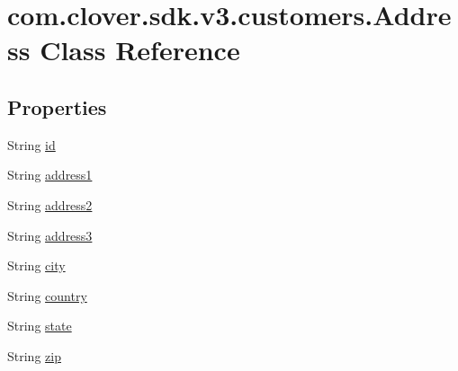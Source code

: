 \hypertarget{classcom_1_1clover_1_1sdk_1_1v3_1_1customers_1_1_address}{}\section{com.\+clover.\+sdk.\+v3.\+customers.\+Address Class Reference}
\label{classcom_1_1clover_1_1sdk_1_1v3_1_1customers_1_1_address}
\subsection*{Properties}
\begin{DoxyCompactItemize}
\item 
String \hyperlink{classcom_1_1clover_1_1sdk_1_1v3_1_1customers_1_1_address_a352fc2a275002b7be701394b061463df}{id}
\item 
String \hyperlink{classcom_1_1clover_1_1sdk_1_1v3_1_1customers_1_1_address_a866e0e686202aa894ed81871cf791489}{address1}
\item 
String \hyperlink{classcom_1_1clover_1_1sdk_1_1v3_1_1customers_1_1_address_aa180e104ea7d2b3f358e69e55b649fa6}{address2}
\item 
String \hyperlink{classcom_1_1clover_1_1sdk_1_1v3_1_1customers_1_1_address_a43d80dd5f9157a717d2dd8167f6b9cbf}{address3}
\item 
String \hyperlink{classcom_1_1clover_1_1sdk_1_1v3_1_1customers_1_1_address_adee08f67e3a02a18ee7ad3d9b457c072}{city}
\item 
String \hyperlink{classcom_1_1clover_1_1sdk_1_1v3_1_1customers_1_1_address_a98ae64269b0d9999ed54d23ffb292b89}{country}
\item 
String \hyperlink{classcom_1_1clover_1_1sdk_1_1v3_1_1customers_1_1_address_aee454257d1c150cf06b2b90837e86fee}{state}
\item 
String \hyperlink{classcom_1_1clover_1_1sdk_1_1v3_1_1customers_1_1_address_a93d8c78240079b9a465b74db05690af6}{zip}
\end{DoxyCompactItemize}


